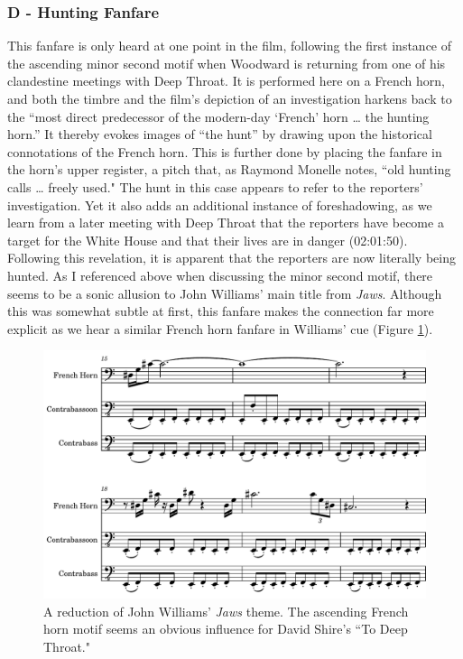 \subsubsection{D - Hunting Fanfare}

This fanfare is only heard at one point in the film, following the first instance of the ascending minor second motif when Woodward is returning from one of his clandestine meetings with Deep Throat.
It is performed here on a French horn, and both the timbre and the film's depiction of an investigation harkens back to the ``most direct predecessor of the modern-day `French’ horn … the hunting horn.”\autocites[][22]{mckinney_forest_2020}
It thereby evokes images of ``the hunt” by drawing upon the historical connotations of the French horn.
This is further done by placing the fanfare in the horn’s upper register, a pitch that, as Raymond Monelle notes, ``old hunting calls … freely used."\autocites[][102]{monelle_horn_2001}
The hunt in this case appears to refer to the reporters’ investigation.
Yet it also adds an additional instance of foreshadowing, as we learn from a later meeting with Deep Throat that the reporters have become a target for the White House and that their lives are in danger (02:01:50).
Following this revelation, it is apparent that the reporters are now literally being hunted.
As I referenced above when discussing the minor second motif, there seems to be a sonic allusion to John Williams' main title from \textit{Jaws}.
Although this was somewhat subtle at first, this fanfare makes the connection far more explicit as we hear a similar French horn fanfare in Williams' cue (Figure \ref{fig:president-jaws-fanfare}).

\begin{figure}
    \centering
    \includegraphics[width=1\linewidth]{img/president-jaws-fanfare.pdf}
    \caption{A reduction of John Williams' \textit{Jaws} theme. The ascending French horn motif seems an obvious influence for David Shire's ``To Deep Throat."}
    \label{fig:president-jaws-fanfare}
\end{figure}

